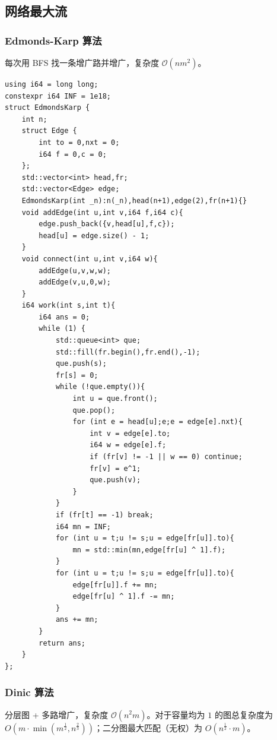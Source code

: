 \subsection{网络最大流}

\subsubsection{Edmonds-Karp 算法}

每次用 BFS 找一条增广路并增广，复杂度 $\mathcal{O}(n m^2)$。

\begin{lstlisting}
using i64 = long long;
constexpr i64 INF = 1e18;
struct EdmondsKarp {
    int n;
    struct Edge {
        int to = 0,nxt = 0;
        i64 f = 0,c = 0;
    };
    std::vector<int> head,fr;
    std::vector<Edge> edge;
    EdmondsKarp(int _n):n(_n),head(n+1),edge(2),fr(n+1){}
    void addEdge(int u,int v,i64 f,i64 c){
        edge.push_back({v,head[u],f,c});
        head[u] = edge.size() - 1;
    }
    void connect(int u,int v,i64 w){
        addEdge(u,v,w,w);
        addEdge(v,u,0,w);
    }
    i64 work(int s,int t){
        i64 ans = 0;
        while (1) {
            std::queue<int> que;
            std::fill(fr.begin(),fr.end(),-1);
            que.push(s);
            fr[s] = 0;
            while (!que.empty()){
                int u = que.front();
                que.pop();
                for (int e = head[u];e;e = edge[e].nxt){
                    int v = edge[e].to;
                    i64 w = edge[e].f;
                    if (fr[v] != -1 || w == 0) continue;
                    fr[v] = e^1;
                    que.push(v);
                }
            }
            if (fr[t] == -1) break;
            i64 mn = INF;
            for (int u = t;u != s;u = edge[fr[u]].to){
                mn = std::min(mn,edge[fr[u] ^ 1].f);
            }
            for (int u = t;u != s;u = edge[fr[u]].to){
                edge[fr[u]].f += mn;
                edge[fr[u] ^ 1].f -= mn;
            }
            ans += mn;
        }
        return ans;
    }
};
\end{lstlisting}

\subsubsection{Dinic 算法}

分层图 + 多路增广，复杂度 $\mathcal{O}(n^2 m)$。对于容量均为 $1$ 的图总复杂度为 $O(m\cdot \min(m^{\frac{1}{2}},n^{\frac{2}{3}}))$；二分图最大匹配（无权）为 $O(n^{\frac{1}{2}}\cdot m)$。

